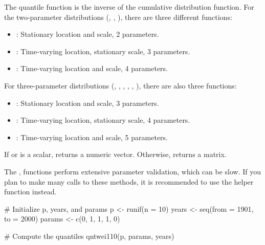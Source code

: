 \documentclass[a4paper]{book}
\begin{document}
%
\begin{Details}
The quantile function is the inverse of the cumulative distribution function.
For the two-parameter distributions (, , ), there are three
different  functions:
\begin{itemize}

\item{} : Stationary location and scale, 2 parameters.
\item{} : Time-varying location, stationary scale, 3 parameters.
\item{} : Time-varying location and scale, 4 parameters.

\end{itemize}


For three-parameter distributions (, , , , , ),
there are also three  functions:
\begin{itemize}

\item{} : Stationary location and scale, 3 parameters.
\item{} : Time-varying location, stationary scale, 4 parameters.
\item{} : Time-varying location and scale, 5 parameters.

\end{itemize}

\end{Details}
%
\begin{Value}
If  or  is a scalar, returns a numeric vector. Otherwise, returns a matrix.
\end{Value}
%
\begin{Note}
The , functions perform extensive parameter validation, which can be slow.
If you plan to make many calls to these methods, it is recommended to use
the  helper function instead.
\end{Note}
%
\begin{SeeAlso}
\end{SeeAlso}
%
\begin{Examples}
\begin{ExampleCode}
# Initialize p, years, and params
p <- runif(n = 10)
years <- seq(from = 1901, to = 2000)
params <- c(0, 1, 1, 1, 0)

# Compute the quantiles
qntwei110(p, params, years)

\end{ExampleCode}
\end{Examples}
\end{document}
